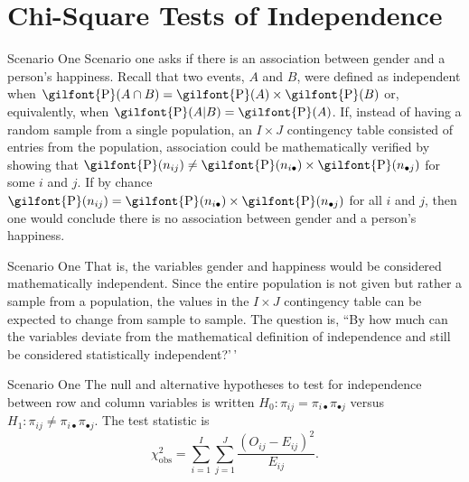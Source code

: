 \documentclass[
  ignorenonframetext,
]{beamer}
\begin{document}
\section{Chi-Square Tests of
Independence}\label{chi-square-tests-of-independence}

\begin{frame}{Scenario One}
\label{scenario-one-2}
Scenario one asks if there is an association between gender and a
person's happiness. Recall that two events, \(A\) and \(B\), were
defined as independent when
\(\textrm{\gilfont{P}}\normalfont (A \cap B)=\textrm{\gilfont{P}}\normalfont (A)\times \textrm{\gilfont{P}}\normalfont (B)\)
or, equivalently, when
\(\textrm{\gilfont{P}}\normalfont (A|B)=\textrm{\gilfont{P}}\normalfont (A)\).
If, instead of having a random sample from a single population, an
\(I \times J\) contingency table consisted of entries from the
population, association could be mathematically verified by showing that
\(\textrm{\gilfont{P}}\normalfont (n_{ij}) \ne \textrm{\gilfont{P}}\normalfont (n_{i\bullet}) \times \textrm{\gilfont{P}}\normalfont (n_{\bullet j})\)
for some \(i\) and \(j\). If by chance
\(\textrm{\gilfont{P}}\normalfont (n_{ij}) = \textrm{\gilfont{P}}\normalfont (n_{i\bullet}) \times \textrm{\gilfont{P}}\normalfont (n_{\bullet j})\)
for all \(i\) and \(j\), then one would conclude there is no association
between gender and a person's happiness.
\end{frame}

\begin{frame}{Scenario One}
\label{scenario-one-3}
That is, the variables gender and happiness would be considered
mathematically independent. Since the entire population is not given but
rather a sample from a population, the values in the \(I \times J\)
contingency table can be expected to change from sample to sample. The
question is, ``By how much can the variables deviate from the
mathematical definition of independence and still be considered
statistically independent?'\,'
\end{frame}

\begin{frame}{Scenario One}
\label{scenario-one-4}
The null and alternative hypotheses to test for independence between row
and column variables is written
\(H_0: \pi_{ij}=\pi_{i\bullet}\pi_{\bullet j}\) versus
\(H_1:\pi_{ij} \ne \pi_{i\bullet}\pi_{\bullet j}\). The test statistic
is \begin{equation}\label{ChiSqStatIndep} \chi_{\text{obs}}^2
=\sum_{i=1}^I\sum_{j=1}^J \frac{(O_{ij} - E_{ij})^2}{E_{ij}}.
\end{equation}
\end{frame}
\end{document}
